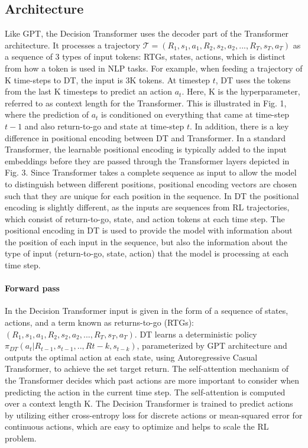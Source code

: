 \documentclass[conference]{IEEEtran}
\begin{document}
\subsection{Architecture}\label{AA}
Like GPT, the Decision Transformer uses the decoder part of the Transformer architecture. It processes a trajectory \(\mathcal{T}= (R_{1},s_{1},a_1,R_2,s_2,a_2,...,R_T,s_T,a_T) \) as a sequence of 3 types of input tokens: RTGs, states, actions, which is distinct from how a token is used in NLP tasks. For example, when feeding a trajectory of K time-steps to DT, the input is 3K tokens. At timestep \(t\), DT uses the tokens from the last K timesteps to predict an action \(a_t\). Here, K is the hyperparameter, referred to as context length for the Transformer. This is illustrated in Fig. 1, where the prediction of \(a_t\) is conditioned on everything that came at time-step \(t-1\) and also return-to-go and state at time-step \(t\). In addition, there is a key difference in positional encoding between DT and Transformer. In a standard Transformer, the learnable positional encoding is typically added to the input embeddings before they are passed through the Transformer layers depicted in Fig. 3. Since Transformer takes a complete sequence as input to allow the  model to distinguish between different positions, positional encoding vectors are chosen such that they are unique for each position in the sequence. In DT the positional encoding is slightly different, as the inputs are sequences from RL trajectories, which consist of return-to-go, state, and action tokens at each time step. The positional encoding in DT is used to provide the model with information about the position of each input in the sequence, but also the information about the type of input (return-to-go, state, action) that the model is processing at each time step.

\paragraph{\textbf{Forward pass}}
In the Decision Transformer input is given in the form of a sequence of states, actions, and a term known as returns-to-go (RTGs): \((R_{1},s_{1},a_1,R_2,s_2,a_2,...,R_T,s_T,a_T)\). DT learns a deterministic policy
\(\pi_{DT}(a_t|R_{t-1},s_{t-1},..,R{t-k},s_{t-k})\), parameterized by GPT architecture\cite{b10} and outputs the optimal action at each state, using Autoregressive Casual Transformer, to achieve the set target return. The self-attention mechanism of the Transformer decides which past actions are more important to consider when predicting the action in the current time step. The self-attention is computed over a context length K. The Decision Transformer is trained to predict actions by utilizing either cross-entropy loss for discrete actions or mean-squared error for continuous actions, which are easy to optimize and helps to scale the RL problem.
\end{document}
